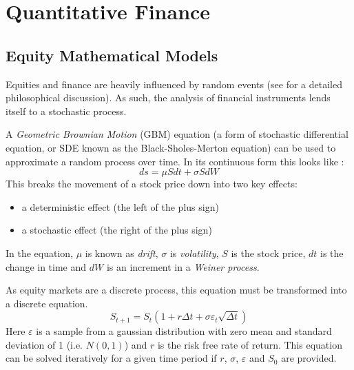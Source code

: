 \chapter{Quantitative Finance}
\label{ch:quantitative-finance}


\section{Equity Mathematical Models}
Equities and finance are heavily influenced by random events (see \cite{fooledbyrandomness} for a detailed philosophical discussion). As such, the analysis of financial instruments lends itself to a stochastic process.

A {\em Geometric Brownian Motion} (GBM) equation (a form of stochastic differential equation, or SDE known as the Black-Sholes-Merton equation\cite{pyfinanceoreilly}) can be used to approximate a random process over time. In its continuous form this looks like \cite{advancedquantcpp}:
\begin{equation}
ds = \mu Sdt+\sigma SdW
\end{equation}
This breaks the movement of a stock price down into two key effects:

\begin{itemize}
	\item a deterministic effect (the left of the plus sign)
	\item a stochastic effect (the right of the plus sign)
\end{itemize}
In the equation, $\mu$ is known as {\it drift}, $\sigma$ is {\it volatility}, $S$ is the stock price, $dt$ is the change in time and $dW$ is an increment in a {\it Weiner process}.

As equity markets are a discrete process, this equation must be transformed into a discrete equation. 
\begin{equation}
S_{t+1}=S_t(1+r\Delta{}t+\sigma\varepsilon_t \sqrt{\Delta{}t})
\end{equation}
Here $\varepsilon$ is a sample from a gaussian distribution with zero mean and standard deviation of 1 (i.e. $N(0,1)$) and $r$ is the risk free rate of return. This equation can be solved iteratively for a given time period if $r$, $\sigma$, $\varepsilon$ and $S_0$ are provided.

